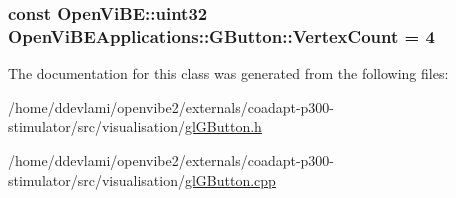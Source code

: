 \label{classOpenViBEApplications_1_1GButton_ac7e4b8f92a1e10ec6c85cd2e41bd6d79}
\hypertarget{classOpenViBEApplications_1_1GButton_a0642f4b200f1d9107f284e3998d1ff1c}{
\subsubsection[{VertexCount}]{\setlength{\rightskip}{0pt plus 5cm}const OpenViBE::uint32 {\bf OpenViBEApplications::GButton::VertexCount} = 4}}
\label{classOpenViBEApplications_1_1GButton_a0642f4b200f1d9107f284e3998d1ff1c}


The documentation for this class was generated from the following files:\begin{DoxyCompactItemize}
\item 
/home/ddevlami/openvibe2/externals/coadapt-\/p300-\/stimulator/src/visualisation/\hyperlink{glGButton_8h}{glGButton.h}\item 
/home/ddevlami/openvibe2/externals/coadapt-\/p300-\/stimulator/src/visualisation/\hyperlink{glGButton_8cpp}{glGButton.cpp}\end{DoxyCompactItemize}
